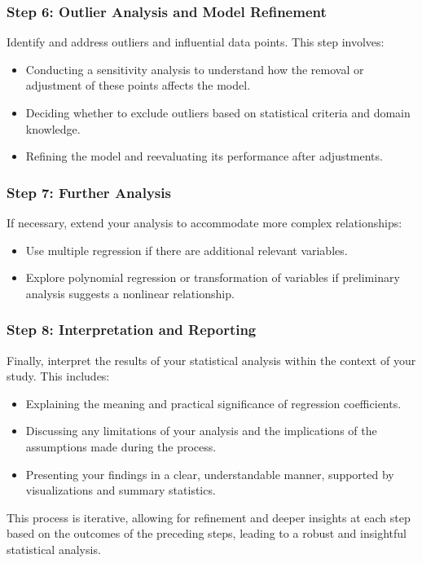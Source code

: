 \documentclass{article}
\begin{document}
\subsubsection*{Step 6: Outlier Analysis and Model Refinement}
Identify and address outliers and influential data points. This step involves:
\begin{itemize}
    \item Conducting a sensitivity analysis to understand how the removal or adjustment of these points affects the model.
    \item Deciding whether to exclude outliers based on statistical criteria and domain knowledge.
    \item Refining the model and reevaluating its performance after adjustments.
\end{itemize}

\subsubsection*{Step 7: Further Analysis}
If necessary, extend your analysis to accommodate more complex relationships:
\begin{itemize}
    \item Use multiple regression if there are additional relevant variables.
    \item Explore polynomial regression or transformation of variables if preliminary analysis suggests a nonlinear relationship.
\end{itemize}

\subsubsection*{Step 8: Interpretation and Reporting}
Finally, interpret the results of your statistical analysis within the context of your study. This includes:
\begin{itemize}
    \item Explaining the meaning and practical significance of regression coefficients.
    \item Discussing any limitations of your analysis and the implications of the assumptions made during the process.
    \item Presenting your findings in a clear, understandable manner, supported by visualizations and summary statistics.
\end{itemize}
This process is iterative, allowing for refinement and deeper insights at each step based on the outcomes of the preceding steps, leading to a robust and insightful statistical analysis.
\end{document}

